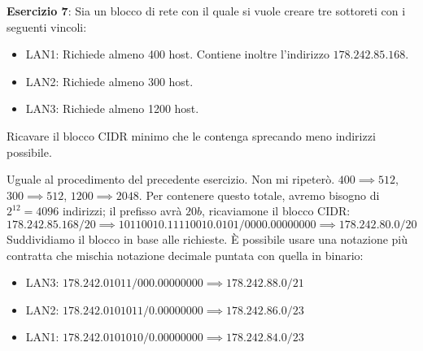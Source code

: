 \noindent \textbf{Esercizio 7}: Sia un blocco di rete con il quale si vuole creare tre sottoreti con i seguenti vincoli: \begin{itemize}
	\item LAN1: Richiede almeno 400 host. Contiene inoltre l'indirizzo $178.242.85.168$.
	\item LAN2: Richiede almeno 300 host.
	\item LAN3: Richiede almeno 1200 host.
\end{itemize}
\noindent Ricavare il blocco CIDR minimo che le contenga sprecando meno indirizzi possibile.\newline

\noindent Uguale al procedimento del precedente esercizio. Non mi ripeterò. $400\implies 512$, $300\implies 512$, $1200\implies 2048$. Per contenere
questo totale, avremo bisogno di $2^{12}=4096$ indirizzi; il prefisso avrà $20b$, ricaviamone il blocco CIDR: \[
	178.242.85.168/20 \implies 10110010.11110010.0101/0000.00000000 \implies 178.242.80.0/20
\]
\noindent Suddividiamo il blocco in base alle richieste. È possibile usare una notazione più contratta che mischia notazione decimale puntata con
quella in binario: \begin{itemize}
	\item LAN3: $178.242.01011/000.00000000 \implies 178.242.88.0/21$ \checkmark
	\item LAN2: $178.242.0101011/0.00000000 \implies 178.242.86.0/23$ \checkmark
	\item LAN1: $178.242.0101010/0.00000000 \implies 178.242.84.0/23$ \checkmark
\end{itemize}